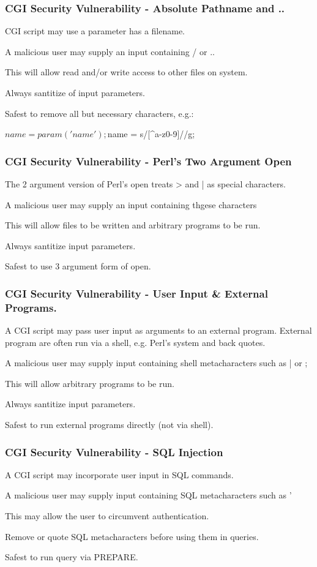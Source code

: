 \begin{frame}[fragile]
\frametitle{CGI Security Vulnerability - Absolute Pathname and ..}
CGI script may use a parameter has a filename. 

A malicious user may supply an input containing / or ..

This will allow read and/or write access to other files on system.

Always santitize of input parameters.

Safest to remove all but necessary characters, e.g.:

\begin{perl}
$name = param('name');
$name = s/[^a-z0-9]//g; 
\end{perl}

\end{frame}

\begin{frame}
\frametitle{CGI Security Vulnerability - Perl's Two Argument Open}
The 2 argument version of Perl's open treats {\textgreater} and |
as special characters.

A malicious user may supply an input containing thgese characters

This will allow files to be written and arbitrary programs to be run.

Always santitize input parameters.

Safest to use 3 argument form of open.
\end{frame}

\begin{frame}
\frametitle{CGI Security Vulnerability - User Input \& External Programs.}

A CGI script may pass user input as arguments to an external program.
External program are often run via a shell, e.g. Perl's system and back quotes.

A malicious user may supply input containing shell metacharacters such as | or ;

This will allow arbitrary programs to be run.

Always santitize input parameters.

Safest to run external programs directly (not via shell).
\end{frame}

\begin{frame}
\frametitle{CGI Security Vulnerability - SQL Injection}

A CGI script may incorporate user input in SQL commands.

A malicious user may supply input containing SQL metacharacters such as '

This may allow the user to circumvent authentication.

Remove or quote SQL metacharacters before using them in queries.

Safest to run query via PREPARE.
\end{frame}

